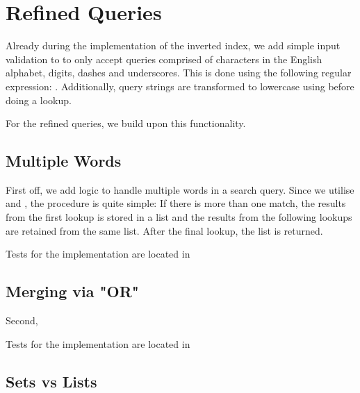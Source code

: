 \section{Refined Queries}

Already during the implementation of the inverted index, we add simple input validation to  to only accept queries comprised of characters in the English alphabet, digits, dashes and underscores. This is done using the following regular expression: \code{[\\\\b([-\\\\w]+)\\\\b]}. Additionally, query strings are transformed to lowercase using before doing a lookup.

For the refined queries, we build upon this functionality.

\subsection{Multiple Words}
First off, we add logic to handle multiple words in a search query. Since we utilise  and , the procedure is quite simple: If there is more than one match, the results from the first lookup is stored in a list and the results from the following lookups are retained from the same list. After the final lookup, the list is returned.

Tests for the implementation are located in 

\subsection{Merging via "OR"}
Second, 

Tests for the implementation are located in 

\subsection{Sets vs Lists}
